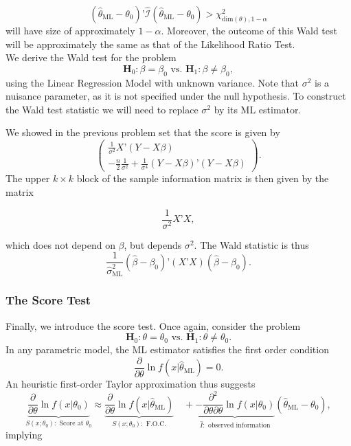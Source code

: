 \documentclass[11pt]{article} %
\begin{document}
\[  (\widehat{\theta}_{\textrm{ML}}-\theta_0)’  \widehat{\mathcal{I}} (\widehat{\theta}_{\textrm{ML}}-\theta_0) > \chi^2_{\textrm{dim}(\theta),1-\alpha} \]
will have size of approximately $1-\alpha$. Moreover, the outcome of this Wald test will be approximately the same as that of the Likelihood Ratio Test. \\

 We derive the Wald test for the problem
\[ \textbf{H}_0: \beta=\beta_0 \textrm{ vs. }  \textbf{H}_1: \beta \neq \beta_0,\]
using the Linear Regression Model with unknown variance. Note that $\sigma^2$ is a nuisance parameter, as it is not specified under the null hypothesis. To construct the Wald test statistic we will need to replace $\sigma^2$ by its ML estimator.  

We showed in the previous problem set that the score is given by
\[\begin{pmatrix}
\frac{1}{\sigma^2}X’(Y-X\beta) \\
-\frac{n}{2} \frac{1}{\sigma^2} + \frac{1}{\sigma^4} (Y-X\beta)’(Y-X\beta)
 \end{pmatrix}.\]
 The upper $k \times k$ block of the sample information matrix is then given by the matrix
 
 \[  \frac{1}{\sigma^2} X’X, \]
 
\noindent which does not depend on $\beta$, but depends $\sigma^2$. The Wald statistic is thus
\[  \frac{1}{\widehat{\sigma}^2_{\textrm{ML}}} (\widehat{\beta} - \beta_0)’(X’X)(\widehat{\beta} - \beta_0).   \]
 


\subsubsection{The Score Test} 
Finally, we introduce the score test. Once again, consider the problem
\[\textbf{H}_0: \theta=\theta_0 \textrm{ vs. }  \textbf{H}_1: \theta \neq \theta_0. \]
In any parametric model, the ML estimator satisfies the first order condition
\[ \frac{\partial}{\partial \theta} \ln f(x | \widehat{\theta}_{\textrm{ML}})  = 0. \]
An heuristic first-order Taylor approximation thus suggests
\[  \underbrace{\frac{\partial}{\partial \theta} \ln f(x | \theta_0)}_{S(x; \theta_0): \textrm{ Score at $\theta_0$} } \approx \underbrace{\frac{\partial}{\partial \theta} \ln f(x | \widehat{\theta}_{\textrm{ML}})}_{S(x; \theta_0): \textrm{ F.O.C.} } \quad + \underbrace{-\frac{\partial^2}{\partial \theta \partial \theta} \ln f(x | \theta_0)}_{\widehat{I}: \textrm{ observed information} } \left( \widehat{\theta}_{\textrm{ML}} - \theta_0 \right), \]
implying
\end{document}
